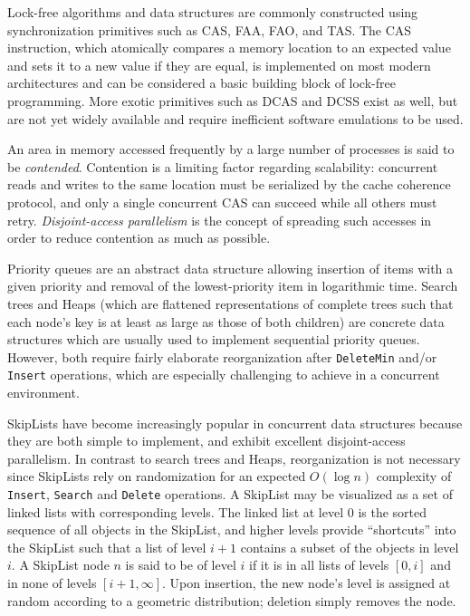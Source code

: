 
Lock-free algorithms and data structures are commonly constructed using synchronization primitives
such as \acf{CAS}, \ac{FAA}, \ac{FAO}, and \ac{TAS}. The \ac{CAS} instruction, which atomically
compares a memory location to an expected value and sets it to a new value if they are equal,
is implemented on most modern architectures and can be considered a basic building block of lock-free
programming. More exotic primitives such as \ac{DCAS} and \ac{DCSS} exist as well, but are not yet
widely available and require inefficient software emulations to be used.


An area in memory accessed frequently by a large number of processes is said to be \emph{contended}.
Contention is a limiting factor regarding scalability: concurrent reads and writes to the same
location must be serialized by the cache coherence protocol, and only a single concurrent \ac{CAS}
can succeed while all others must retry. \emph{Disjoint-access parallelism} is the concept of
spreading such accesses in order to reduce contention as much as possible.


Priority queues are an abstract data structure allowing insertion of items with a given priority
and removal of the lowest-priority item in logarithmic time. Search trees and Heaps (which are
flattened representations of complete trees such that each node's key is at least as large as
those of both children) are concrete data structures which are usually used to implement sequential
priority queues. However, both require fairly elaborate reorganization after
{\lstset{breakatwhitespace=true} \lstinline|DeleteMin|}
and/or \lstinline|Insert| operations, which are especially challenging to achieve in a concurrent
environment.


SkipLists \cite{pugh1990skip} have become increasingly popular in concurrent data structures because
they are both simple to implement, and exhibit excellent disjoint-access parallelism. In contrast to
search trees and Heaps, reorganization is not necessary since SkipLists rely on
randomization for an expected $O(\log n)$ complexity of \lstinline|Insert|, \lstinline|Search|
and \lstinline|Delete| operations.
A SkipList may be visualized as a set of linked lists with corresponding levels. The linked
list at level 0 is the sorted sequence of all objects in the SkipList,
and higher levels provide ``shortcuts''
into the SkipList such that a list of level $i + 1$ contains a subset of the objects in level
$i$. A SkipList node $n$ is said to be of level $i$ if it is in all lists of levels $[0, i]$
and in none of levels $[i + 1, \infty]$. Upon insertion, the new node's level is assigned at random
according to a geometric distribution; deletion simply removes the node.

